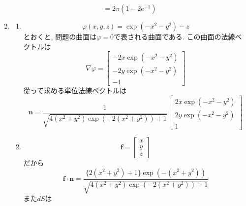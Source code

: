 \documentclass[a4paper,10pt,report]{amsart}
\theoremstyle{plain}
\theoremstyle{definition}
\theoremstyle{remark}
\begin{document}
\begin{enumerate}
\begin{equation*}
        \end{equation*}
        \begin{equation*}
            =2\pi(1-2e^{-1})
        \end{equation*}
        \item 
        \begin{enumerate}
            \item 
            \begin{equation*}
                \varphi(x,y,z)=\exp{(-x^{2}-y^{2})}-z
            \end{equation*}
            とおくと, 問題の曲面は\(\varphi=0\)で表される曲面である. この曲面の法線ベクトルは
            \begin{equation*}
                \nabla \varphi=\begin{bmatrix}
                    -2x\exp{(-x^{2}-y^{2})}\\
                    -2y\exp{(-x^{2}-y^{2})}\\
                    -1
                \end{bmatrix}
            \end{equation*}
            從って求める単位法線ベクトルは
            \begin{equation*}
                \bm{n}=\frac{1}{\sqrt{4(x^{2}+y^{2})\exp{(-2(x^{2}+y^{2}))}+1}}\begin{bmatrix}
                    2x\exp{(-x^{2}-y^{2})}\\
                    2y\exp{(-x^{2}-y^{2})}\\
                    1
                \end{bmatrix}
            \end{equation*}
            \item 
            \begin{equation*}
                \bm{f}=\begin{bmatrix}
                    x\\
                    y\\
                    z
                \end{bmatrix}
            \end{equation*}
            だから
            \begin{equation*}
                \bm{f}\cdot\bm{n}=\frac{\{2(x^{2}+y^{2})+1\}\exp{(-(x^{2}+y^{2}))}}{\sqrt{4(x^{2}+y^{2})\exp{(-2(x^{2}+y^{2}))}+1}}
            \end{equation*}
            また\(dS\)は
            \begin{equation*}

\end{equation*}
\end{enumerate}
\end{enumerate}
\end{document}
